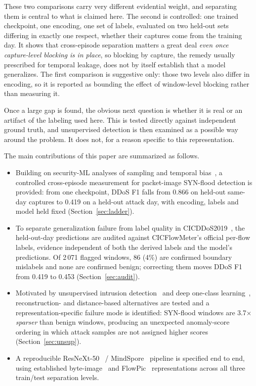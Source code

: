 \documentclass[conference]{IEEEtran} \IEEEoverridecommandlockouts
\begin{document}
These two comparisons carry very different evidential weight, and separating
them is central to what is claimed here. The second is controlled: one trained
checkpoint, one encoding, one set of labels, evaluated on two held-out sets
differing in exactly one respect, whether their captures come from the training
day. It shows that cross-episode separation matters a great
deal \emph{even once capture-level blocking is in place}, so blocking by
capture, the remedy usually prescribed for temporal leakage, does not by itself
establish that a model generalizes. The first comparison is suggestive only:
those two levels also differ in encoding, so it is reported as bounding the
effect of window-level blocking rather than measuring it.

Once a large gap is found, the obvious next question is whether it is real or
an artifact of the labeling used here. This is tested directly against
independent ground truth, and unsupervised detection is then examined as a
possible way around the problem. It does not, for a reason specific to this
representation.

The main contributions of this paper are summarized as follows.
\begin{itemize}
  \item Building on security-ML analyses of sampling and temporal
        bias~\cite{arp2022dos,pendlebury2019tesseract}, a controlled cross-episode measurement for packet-image SYN-flood detection is provided: from
        one checkpoint, DDoS F1 falls from 0.866 on held-out same-day captures
        to 0.419 on a held-out attack day, with encoding, labels and model held
        fixed (Section~\ref{sec:ladder}).
  \item To separate generalization failure from label quality in
        CICDDoS2019~\cite{sharafaldin2019ddos}, the held-out-day predictions are audited against CICFlowMeter's official per-flow labels, evidence independent of both the derived labels and the model's predictions. Of 2\,071 flagged windows, 86 (4\%) are confirmed
        boundary mislabels and none are confirmed benign; correcting them moves
        DDoS F1 from 0.419 to 0.453 (Section~\ref{sec:audit}).
  \item Motivated by unsupervised intrusion detection~\cite{mirsky2018kitsune}
        and deep one-class learning~\cite{ruff2018deep}, reconstruction- and distance-based alternatives are tested and a
        representation-specific failure mode is identified: SYN-flood windows
        are 3.7$\times$ \emph{sparser} than benign windows, producing an
        unexpected anomaly-score ordering in which attack samples are not
        assigned higher scores (Section~\ref{sec:unsup}).
  \item A reproducible ResNeXt-50~\cite{xie2017aggregated} / MindSpore~\cite{mindspore} pipeline is specified end to end, using established byte-image~\cite{bazzi2024resnet} and FlowPic~\cite{shapira2019flowpic} representations across all three train/test separation levels.
\end{itemize}
\end{document}

